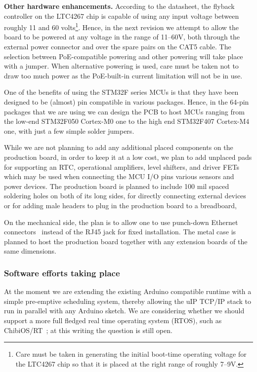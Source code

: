 \documentclass[draft,a4paper]{siamltex}
\begin{document}
{\bf Other hardware enhancements.}
According to the datasheet, the flyback controller on the LTC4267 chip
is capable of using any input voltage between roughly 11 and 60
volts\footnote{Care must be taken in generating the initial
boot-time operating voltage for the LTC4267 chip so that it is placed
at the right range of roughly 7--9V.}.  Hence, in the next revision we
attempt to allow the board to be powered at any voltage in the range
of 11--60V, both through the external power connector and over the
spare pairs on the CAT5 cable.  The selection between PoE-compatible
powering and other powering will take place with a jumper.  When
alternative powering is used, care must be taken not to draw too much
power as the PoE-built-in current limitation will not be in use.

One of the benefits of using the STM32F series MCUs is that they have
been designed to be (almost) pin compatible in various packages.
Hence, in the 64-pin packages that we are using we can design the PCB
to host MCUs ranging from the low-end STM32F050 Cortex-M0 one to the
high end STM32F407 Cortex-M4 one, with just a few simple solder
jumpers.

While we are not planning to add any additional placed components on
the production board, in order to keep it at a low cost, we plan to
add unplaced pads for supporting an RTC, operational amplifiers, level
shifters, and driver FETs which may be used when connecting the MCU
I/O pins various sensors and power devices.  The production board is
planned to include 100 mil spaced soldering holes on both of its long
sides, for directly connecting external devices or for adding male
headers to plug in the production board to a breadboard,

On the mechanical side, the plan is to allow one to use
punch-down Ethernet connectors~\cite{Krone} instead of the RJ45 jack
for fixed installation.  The metal case is planned to host the
production board together with any extension boards of the same
dimensions.

\subsubsection{Software efforts taking place}

At the moment we are extending the existing Arduino compatible runtime
with a simple pre-emptive scheduling system, thereby allowing the uIP
TCP/IP stack to run in parallel with any Arduino sketch.  We are
considering whether we should support a more full fledged real time
operating system (RTOS), such as ChibiOS/RT~\cite{ChibiOS}; at this
writing the question is still open.
\end{document}
